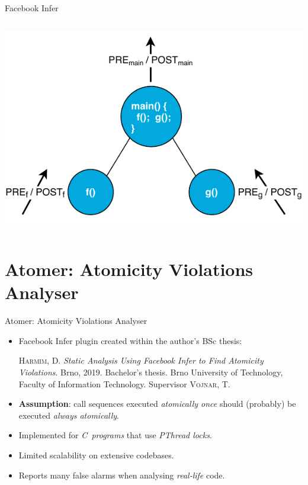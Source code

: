 \documentclass[10pt, xcolor=pdflatex, hyperref={unicode}, aspectratio=169]{beamer}
\begin{document}
\begin{frame}{Facebook Infer}
\begin{columns}
        \begin{column}{.45 \linewidth}
            \centering
            \includegraphics[width=1 \linewidth]{infer.pdf}
        \end{column}
    \end{columns}
\end{frame}


\section{Atomer: Atomicity Violations Analyser}
\begin{frame}{Atomer: Atomicity Violations Analyser}
    \begin{itemize}\setlength\itemsep{1.5em}
        \item \alert{Facebook Infer plugin} created within the author's BSc thesis:
            \medskip
            \begin{thebibliography}{1}
                \textsc{Harmim, D.} \textit{Static Analysis Using Facebook Infer to Find Atomicity Violations}. Brno, 2019. Bachelor's thesis. Brno University of Technology, Faculty of Information Technology. Supervisor \textsc{Vojnar, T.}
            \end{thebibliography}

        \item \textbf{Assumption}: \alert{call sequences} executed \emph{atomically once} should (probably) be executed \emph{always atomically}.

        \item Implemented for \emph{C~programs} that use \emph{PThread locks}.

        \item Limited \alert{scalability} on extensive codebases.

        \item Reports many \alert{false alarms} when analysing \emph{real-life} code.
    \end{itemize}
\end{frame}
\end{document}

